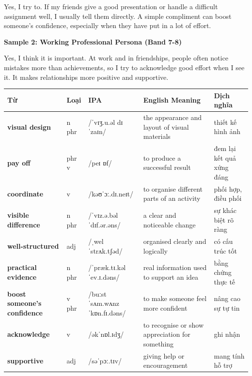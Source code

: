 Yes, I try to. If my friends give a good presentation or handle a difficult assignment well, I usually tell them directly. A simple compliment can boost someone's confidence, especially when they have put in a lot of effort.

\textbf{Sample 2: Working Professional Persona (Band 7-8)}

Yes, I think it is important. At work and in friendships, people often notice mistakes more than achievements, so I try to acknowledge good effort when I see it. It makes relationships more positive and supportive.

\separator


\vspace{0.8em}
\begin{center}
\renewcommand{\arraystretch}{1.65}
\begin{tabularx}{\textwidth}{|V{0.22\textwidth}|C{0.07\textwidth}|I{0.20\textwidth}|Y|V{0.18\textwidth}|}
\hline
{}
\textbf{Từ} & \textbf{Loại} & \textbf{IPA} & \textbf{English Meaning} & \textbf{Dịch nghĩa} \\
\hline
\textbf{visual design} & n phr & /ˈvɪʒ.u.əl dɪˈzaɪn/ & the appearance and layout of visual materials & thiết kế hình ảnh \\ \hline
\textbf{pay off} & phr v & /peɪ ɒf/ & to produce a successful result & đem lại kết quả xứng đáng \\ \hline
\textbf{coordinate} & v & /kəʊˈɔː.dɪ.neɪt/ & to organise different parts of an activity & phối hợp, điều phối \\ \hline
\textbf{visible difference} & n phr & /ˈvɪz.ə.bəl ˈdɪf.ər.əns/ & a clear and noticeable change & sự khác biệt rõ ràng \\ \hline
\textbf{well-structured} & adj & /ˌwel ˈstrʌk.tʃəd/ & organised clearly and logically & có cấu trúc tốt \\ \hline
\textbf{practical evidence} & n phr & /ˈpræk.tɪ.kəl ˈev.ɪ.dəns/ & real information used to support an idea & bằng chứng thực tế \\ \hline
\textbf{boost someone's confidence} & v phr & /buːst ˈsʌm.wʌnz ˈkɒn.fɪ.dəns/ & to make someone feel more confident & nâng cao sự tự tin \\ \hline
\textbf{acknowledge} & v & /əkˈnɒl.ɪdʒ/ & to recognise or show appreciation for something & ghi nhận \\ \hline
\textbf{supportive} & adj & /səˈpɔː.tɪv/ & giving help or encouragement & mang tính hỗ trợ \\ \hline
\end{tabularx}
\end{center}

